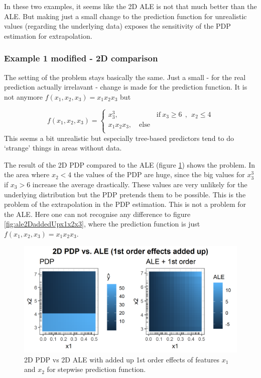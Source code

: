 \documentclass[
]{krantz}
\begin{document}
In these two examples, it seems like the 2D ALE is not that much better than the ALE. But making just a small change to the prediction function for unrealistic values (regarding the underlying data) exposes the sensitivity of the PDP estimation for extrapolation.

\hypertarget{example-1-modified---2d-comparison}{%
\subsubsection{Example 1 modified - 2D comparison}\label{example-1-modified---2d-comparison}}

The setting of the problem stays basically the same. Just a small - for the real prediction actually irrelavant - change is made for the prediction function. It is not anymore \(f(x_1, x_2, x_3) = x_1 x_2 x_3\) but

\[
f(x_1, x_2, x_3) =  
     \begin{cases}
       x_3^3, \quad\quad\quad\quad\quad~~\text{if}~x_3\ge6 ~~, ~~x_2\le4\\
       x_1 x_2 x_3, \quad\text{else}\\
     \end{cases}
\]
This seems a bit unrealistic but especially tree-based predictors tend to do `strange' things in areas without data.

The result of the 2D PDP compared to the ALE (figure \ref{fig:pdp2Ddamaged}) shows the problem. In the area where \(x_2 < 4\) the values of the PDP are huge, since the big values for \(x_3^3\) if \(x_3 > 6\) increase the average drastically. These values are very unlikely for the underlying distribution but the PDP pretends them to be possible. This is the problem of the extrapolation in the PDP estimation. This is not a problem for the ALE. Here one can not recognise any difference to figure \ref{fig:ale2DaddedUpx1x2x3}, where the prediction function is just \(f(x_1, x_2, x_3) = x_1 x_2 x_3\).

\begin{figure}
\includegraphics[width=1\linewidth]{images/ale_1_comp_2d_1st_orders_added_and_smaller3_bigger6_x1x2x3_150_0_0p5_5_1} \caption{2D PDP vs 2D ALE with added up 1st order effects of features \(x_1\) and \(x_2\) for stepwise prediction function.}\label{fig:pdp2Ddamaged}
\end{figure}
\end{document}
